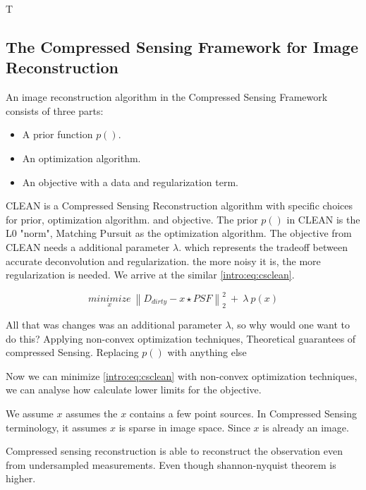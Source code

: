 T%


\subsection{The Compressed Sensing Framework for Image Reconstruction}
An image reconstruction algorithm in the Compressed Sensing Framework consists of three parts:

\begin{itemize}
	\item A prior function $p()$.
	\item An optimization algorithm.
	\item An objective with a data and regularization term.
\end{itemize}

CLEAN is a Compressed Sensing Reconstruction algorithm with specific choices for prior, optimization algorithm. and objective. The prior $p()$ in CLEAN is the L0 "norm", Matching Pursuit as the optimization algorithm. The objective from CLEAN needs a additional parameter $\lambda$.  which represents the tradeoff between accurate deconvolution and regularization. the more noisy it is, the more regularization is needed. We arrive at the similar \eqref{intro:eq:csclean}.

\begin{equation}\label{intro:eq:csclean}
\underset{x}{minimize} \: \left \| D_{dirty} - x \star PSF \right \|_2^2 \: + \: \lambda \: p(x) 
\end{equation}

All that was changes was an additional parameter $\lambda$, so why would one want to do this? 
Applying non-convex optimization techniques,
Theoretical guarantees of compressed Sensing.
Replacing $p()$ with anything else

Now we can minimize \eqref{intro:eq:csclean} with non-convex optimization techniques, we can analyse how calculate lower limits for the objective.


We assume $x$ assumes the $x$ contains a few point sources. In Compressed Sensing terminology, it assumes $x$ is sparse in image space. Since $x$ is already an image.


Compressed sensing reconstruction is able to reconstruct the observation even from undersampled measurements. Even though shannon-nyquist theorem is higher.

